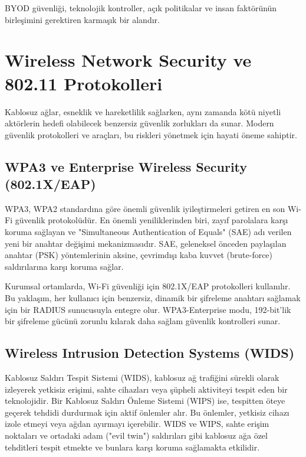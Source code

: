 BYOD güvenliği, teknolojik kontroller, açık politikalar ve insan faktörünün birleşimini gerektiren karmaşık bir alandır.

\section{Wireless Network Security ve 802.11 Protokolleri}

Kablosuz ağlar, esneklik ve hareketlilik sağlarken, aynı zamanda kötü niyetli aktörlerin hedefi olabilecek benzersiz güvenlik zorlukları da sunar. Modern güvenlik protokolleri ve araçları, bu riskleri yönetmek için hayati öneme sahiptir.

\subsection{WPA3 ve Enterprise Wireless Security (802.1X/EAP)}

WPA3, WPA2 standardına göre önemli güvenlik iyileştirmeleri getiren en son Wi-Fi güvenlik protokolüdür. En önemli yeniliklerinden biri, zayıf parolalara karşı koruma sağlayan ve "Simultaneous Authentication of Equals" (SAE) adı verilen yeni bir anahtar değişimi mekanizmasıdır. SAE, geleneksel önceden paylaşılan anahtar (PSK) yöntemlerinin aksine, çevrimdışı kaba kuvvet (brute-force) saldırılarına karşı koruma sağlar.

Kurumsal ortamlarda, Wi-Fi güvenliği için 802.1X/EAP protokolleri kullanılır. Bu yaklaşım, her kullanıcı için benzersiz, dinamik bir şifreleme anahtarı sağlamak için bir RADIUS sunucusuyla entegre olur. WPA3-Enterprise modu, 192-bit'lik bir şifreleme gücünü zorunlu kılarak daha sağlam güvenlik kontrolleri sunar.

\subsection{Wireless Intrusion Detection Systems (WIDS)}

Kablosuz Saldırı Tespit Sistemi (WIDS), kablosuz ağ trafiğini sürekli olarak izleyerek yetkisiz erişimi, sahte cihazları veya şüpheli aktiviteyi tespit eden bir teknolojidir. Bir Kablosuz Saldırı Önleme Sistemi (WIPS) ise, tespitten öteye geçerek tehdidi durdurmak için aktif önlemler alır. Bu önlemler, yetkisiz cihazı izole etmeyi veya ağdan ayırmayı içerebilir. WIDS ve WIPS, sahte erişim noktaları ve ortadaki adam ("evil twin") saldırıları gibi kablosuz ağa özel tehditleri tespit etmekte ve bunlara karşı koruma sağlamakta etkilidir.

